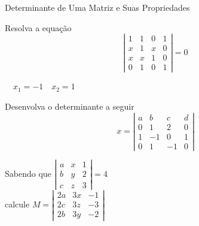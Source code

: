 \begin{exercicios}{Determinante de Uma Matriz e Suas Propriedades}
    \begin{exercicio}
        Resolva a equação
        \[\left|\begin{array}{cccc}
            1 & 1 & 0 & 1 \\ 
            x & 1 & x & 0 \\ 
            x & x & 1 & 0 \\ 
            0 & 1 & 0 & 1
        \end{array} \right| = 0\]
        \begin{answers} \(\quad x_1 = -1 \quad x_2 = 1 \)
        \end{answers}
    \end{exercicio}
    
    \begin{exercicio}
        Desenvolva o determinante a seguir
        \[x = \left|\begin{array}{rrrr}
        	a & b  &  c & d \\
        	0 & 1  &  2 & 0 \\
        	1 & -1 &  0 & 1 \\
        	0 & 1  & -1 & 0
        \end{array} \right|\]
    \end{exercicio}
    
    \begin{exercicio}
        Sabendo que
        \( \left|\begin{array}{ccc}
        	a & x & 1 \\
        	b & y & 2 \\
        	c & z & 3
        \end{array} \right| = 4  \) \\
        calcule
        \( M = \left|\begin{array}{ccc}
        	2a & 3x & -1 \\
        	2c & 3z & -3 \\
        	2b & 3y & -2
        \end{array} \right|  \)
    \end{exercicio}
    

\end{exercicios}
